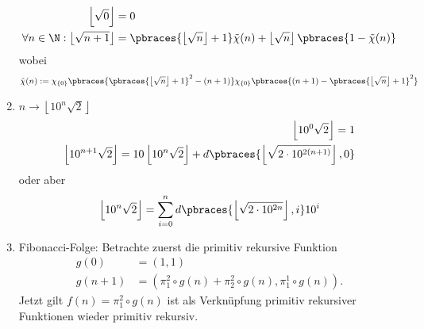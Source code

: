 \begin{solution}
\begin{enumerate}
			\begin{align*}
			\left\lfloor \sqrt{0} \right\rfloor &= 0 \\
			\forall n \in \N : \left\lfloor \sqrt{n + 1} \right\rfloor &= \pbraces{\left\lfloor \sqrt n \right\rfloor + 1} \tilde{\chi}(n) + \left\lfloor \sqrt n \right\rfloor \pbraces{1 - \tilde{\chi}(n)}
			\end{align*}
			wobei
			\begin{align*}
			\tilde{\chi}(n) := \chi_{\{0\}}\pbraces{\pbraces{\left\lfloor \sqrt n \right\rfloor + 1}^2 - (n + 1)} \chi_{\{0\}}\pbraces{(n + 1) - \pbraces{\left\lfloor \sqrt n \right\rfloor + 1}^2}
			\end{align*}
		\item $n \to \left\lfloor 10^n \sqrt{2}  \right\rfloor$
			\begin{align*}
			\left\lfloor 10^0 \sqrt{2}  \right\rfloor = 1 \\
			\left\lfloor 10^{n + 1} \sqrt{2}  \right\rfloor = 10 \left\lfloor 10^n \sqrt{2}  \right\rfloor + d\pbraces{\left \lfloor \sqrt{2 \cdot 10^{2(n + 1)}} \right\rfloor, 0}
			\end{align*}
			oder aber
			\begin{align*}
			\left\lfloor 10^n \sqrt 2 \right\rfloor = \sum_{i = 0}^n d\pbraces{\left \lfloor \sqrt{2 \cdot 10^{2n}} \right\rfloor, i} 10^i
			\end{align*}
		\item Fibonacci-Folge: Betrachte zuerst die primitiv rekursive Funktion
		\begin{align*}
			g(0) &= (1,1) \\
			g(n+1) &= (\pi_1^2\circ g(n) + \pi_2^2\circ g(n), \pi_1^1 \circ g(n)).
		\end{align*}
		Jetzt gilt $f(n) = \pi_1^2 \circ g (n)$ ist als Verknüpfung primitiv rekursiver
		Funktionen wieder primitiv rekursiv.
	\end{enumerate}

\end{solution}
